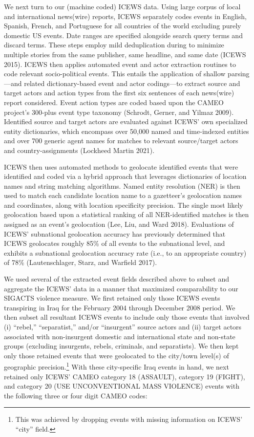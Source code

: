 \documentclass[12pt]{article}
\begin{document}
We next turn to our (machine coded) ICEWS data. Using large corpus of local and international news(wire) reports, ICEWS separately codes events in English, Spanish, French, and Portuguese for all countries of the world excluding purely domestic US events. Date ranges are specified alongside search query terms and discard terms. These steps employ mild deduplication during to minimize multiple stories from the same publisher, same headline, and same date (ICEWS 2015). ICEWS then applies automated event and actor extraction routines to code relevant socio-political events. This entails the application of shallow parsing---and related dictionary-based event and actor codings---to extract source and target actors and action types from the first six sentences of each news(wire) report considered. Event action types are coded based upon the CAMEO project's 300-plus event type taxonomy (Schrodt, Gerner, and Yilmaz 2009). Identified source and target actors are evaluated against ICEWS' own specialized entity dictionaries, which encompass over 50,000 named and time-indexed entities and over 700 generic agent names for matches to relevant source/target actors and country-assignments (Lockheed Martin 2021).

ICEWS then uses automated methods to geolocate identified events that were identified and coded via a hybrid approach that leverages  dictionaries of location names and string matching algorithms. Named entity resolution (NER) is then used to match each candidate location name to a gazetteer's geolocation names and coordinates, along with location specificity precision. The single most likely geolocation based upon a statistical ranking of all NER-identified matches is then assigned as an event's geolocation (Lee, Liu, and Ward 2018). Evaluations of ICEWS' subnational geolocation accuracy has previously determined that ICEWS geolocates roughly 85\% of all events to the subnational level, and exhibits a subnational geolocation accuracy rate (i.e., to an appropriate country) of 78\% (Lautenschlager, Starz, and Warfield 2017).

We used several of the extracted event fields described above to subset and aggregate the ICEWS' data in a manner that maximized comparability to our SIGACTS violence measure. We first retained only those ICEWS events transpiring in Iraq for the February 2004 through December 2008 period. We then subset all resultant ICEWS events to include only those events that involved (i) ``rebel,'' ``separatist,'' and/or ``insurgent'' source actors and (ii) target actors associated with non-insurgent domestic and international state and non-state groups (excluding insurgents, rebels, criminals, and separatists). We then kept only those retained events that were geolocated to the city/town level(s) of geographic precision.\footnote{This was achieved by dropping events with missing information on ICEWS' ``city'' field.}  With these city-specific Iraq events in hand, we next retained only ICEWS' CAMEO category 18 (ASSAULT), category 19 (FIGHT), and category 20 (USE UNCONVENTIONAL MASS VIOLENCE) events with the following three or four digit CAMEO codes:\\
\end{document}
